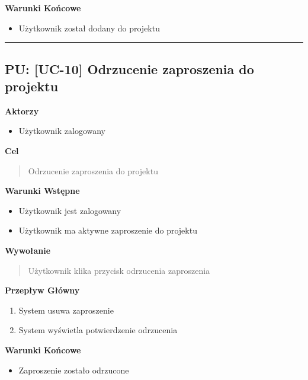 \vspace{0.2cm}
\noindent\textbf{Warunki Końcowe}
\begin{itemize}
    \item Użytkownik został dodany do projektu
\end{itemize}


\hrule
\vspace{1cm}

\subsection*{PU: [UC-10] Odrzucenie zaproszenia do projektu}

\noindent\textbf{Aktorzy}
\begin{itemize}
    \item Użytkownik zalogowany
\end{itemize}

\vspace{0.2cm}
\noindent\textbf{Cel}
\begin{quote}
    Odrzucenie zaproszenia do projektu
\end{quote}

\vspace{0.2cm}
\noindent\textbf{Warunki Wstępne}
\begin{itemize}
    \item Użytkownik jest zalogowany
    \item Użytkownik ma aktywne zaproszenie do projektu
\end{itemize}

\vspace{0.2cm}
\noindent\textbf{Wywołanie}
\begin{quote}
    Użytkownik klika przycisk odrzucenia zaproszenia
\end{quote}

\vspace{0.2cm}
\noindent\textbf{Przepływ Główny}
\begin{enumerate}
    \item System usuwa zaproszenie
    \item System wyświetla potwierdzenie odrzucenia
\end{enumerate}

\vspace{0.2cm}
\noindent\textbf{Warunki Końcowe}
\begin{itemize}
    \item Zaproszenie zostało odrzucone
\end{itemize}


